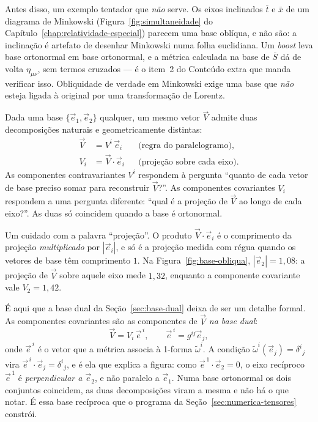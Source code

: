 \documentclass[12pt,a4paper,oneside]{book}
\theoremstyle{rgplain}
\theoremstyle{rgremark}
\begin{document}
Antes disso, um exemplo tentador que \emph{não} serve. Os eixos inclinados
$\bar t$ e $\bar x$ de um diagrama de Minkowski
(Figura~\ref{fig:simultaneidade} do
Capítulo~\ref{chap:relatividade-especial}) parecem uma base oblíqua, e não
são: a inclinação é artefato de desenhar Minkowski numa folha euclidiana. Um
\emph{boost} leva base ortonormal em base ortonormal, e a métrica calculada na
base de $\bar S$ dá de volta $\eta_{\mu\nu}$, sem termos cruzados --- é o
item~2 do Conteúdo extra que manda verificar isso. Obliquidade de verdade em
Minkowski exige uma base que \emph{não} esteja ligada à original por uma
transformação de Lorentz.

Dada uma base $\{\vec e_1,\vec e_2\}$ qualquer, um mesmo vetor $\vec V$ admite
duas decomposições naturais e geometricamente distintas:
\begin{align*}
  \vec V &= V^i\,\vec e_i && \text{(regra do paralelogramo)},\\
  V_i &= \vec V\cdot\vec e_i && \text{(projeção sobre cada eixo)}.
\end{align*}
As componentes contravariantes $V^i$ respondem à pergunta ``quanto de cada
vetor de base preciso somar para reconstruir $\vec V$?''. As componentes
covariantes $V_i$ respondem a uma pergunta diferente: ``qual é a projeção de
$\vec V$ ao longo de cada eixo?''. As duas só coincidem quando a base é
ortonormal.

Um cuidado com a palavra ``projeção''. O produto $\vec V\cdot\vec e_i$ é o
comprimento da projeção \emph{multiplicado} por $|\vec e_i|$, e só é a
projeção medida com régua quando os vetores de base têm comprimento $1$. Na
Figura~\ref{fig:base-obliqua}, $|\vec e_2|=1{,}08$: a projeção de $\vec V$ sobre
aquele eixo mede $1{,}32$, enquanto a componente covariante vale
$V_2=1{,}42$.

É aqui que a base dual da Seção~\ref{sec:base-dual} deixa de ser um detalhe
formal. As componentes covariantes são as componentes de $\vec V$ \emph{na base
dual}:
\[
  \vec V=V_i\,\vec e^{\,i},
  \qquad
  \vec e^{\,i}=g^{ij}\vec e_j ,
\]
onde $\vec e^{\,i}$ é o vetor que a métrica associa à 1-forma
$\tilde\omega^i$. A condição $\tilde\omega^i(\vec e_j)=\delta^i{}_j$ vira
$\vec e^{\,i}\cdot\vec e_j=\delta^i{}_j$, e é ela que explica a figura: como
$\vec e^{\,1}\cdot\vec e_2=0$, o eixo recíproco $\vec e^{\,1}$ é
\emph{perpendicular a $\vec e_2$}, e não paralelo a $\vec e_1$. Numa base
ortonormal os dois conjuntos coincidem, as duas decomposições viram a mesma e
não há o que notar. É essa base recíproca que o programa da
Seção~\ref{sec:numerica-tensores} constrói.
\end{document}
